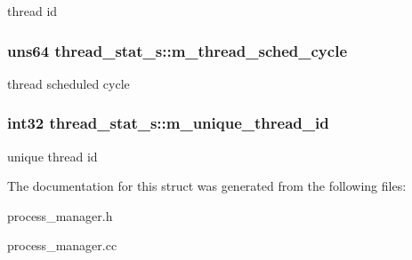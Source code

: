 \label{structthread__stat__s_a73159fa4a36b03ae2affe98e351a3c14}
thread id \hypertarget{structthread__stat__s_ae566a7e5f2c647c9fcae9d6699f4263d}{
\subsubsection[{m\_\-thread\_\-sched\_\-cycle}]{\setlength{\rightskip}{0pt plus 5cm}uns64 {\bf thread\_\-stat\_\-s::m\_\-thread\_\-sched\_\-cycle}}}
\label{structthread__stat__s_ae566a7e5f2c647c9fcae9d6699f4263d}
thread scheduled cycle \hypertarget{structthread__stat__s_a9422613d9040a649e0dbc709222194cc}{
\subsubsection[{m\_\-unique\_\-thread\_\-id}]{\setlength{\rightskip}{0pt plus 5cm}int32 {\bf thread\_\-stat\_\-s::m\_\-unique\_\-thread\_\-id}}}
\label{structthread__stat__s_a9422613d9040a649e0dbc709222194cc}
unique thread id 

The documentation for this struct was generated from the following files:\begin{DoxyCompactItemize}
\item 
process\_\-manager.h\item 
process\_\-manager.cc\end{DoxyCompactItemize}
